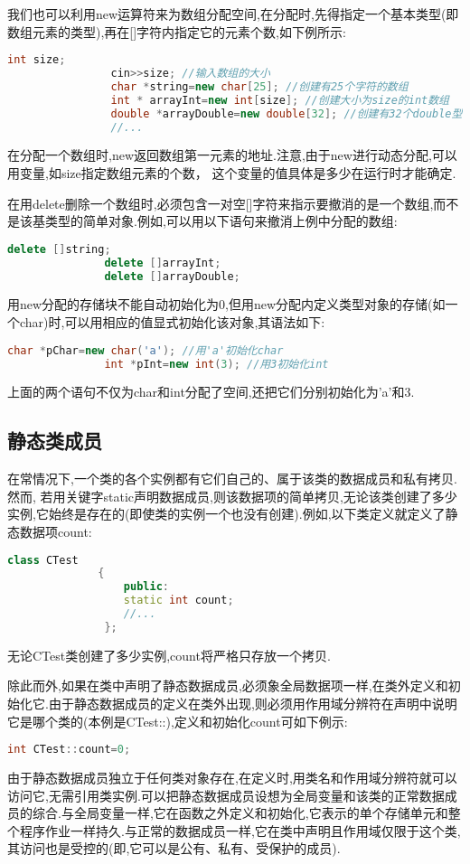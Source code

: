 \documentclass{article}
\begin{document}
我们也可以利用new运算符来为数组分配空间,在分配时,先得指定一个基本类型(即数组元素的类型),再在[]字符内指定它的元素个数,如下例所示:
\begin{lstlisting}[language=c++]
                int size;
                cin>>size; //输入数组的大小
                char *string=new char[25]; //创建有25个字符的数组
                int * arrayInt=new int[size]; //创建大小为size的int数组
                double *arrayDouble=new double[32]; //创建有32个double型元素的数组
                //...
\end{lstlisting}
在分配一个数组时,new返回数组第一元素的地址.注意,由于new进行动态分配,可以用变量,如size指定数组元素的个数， 这个变量的值具体是多少在运行时才能确定.

在用delete删除一个数组时,必须包含一对空[]字符来指示要撤消的是一个数组,而不是该基类型的简单对象.例如,可以用以下语句来撤消上例中分配的数组:
\begin{lstlisting}[language=c++]
               delete []string;
               delete []arrayInt;
               delete []arrayDouble;
\end{lstlisting}
用new分配的存储块不能自动初始化为0,但用new分配内定义类型对象的存储(如一个char)时,可以用相应的值显式初始化该对象,其语法如下:
\begin{lstlisting}[language=c++]
               char *pChar=new char('a'); //用'a'初始化char
               int *pInt=new int(3); //用3初始化int
\end{lstlisting}
上面的两个语句不仅为char和int分配了空间,还把它们分别初始化为'a'和3.
\subsection{静态类成员}
\label{sec-2-3}
在常情况下,一个类的各个实例都有它们自己的、属于该类的数据成员和私有拷贝.然而, 若用关键字static声明数据成员,则该数据项的简单拷贝,无论该类创建了多少实例,它始终是存在的(即使类的实例一个也没有创建).例如,以下类定义就定义了静态数据项count:
\begin{lstlisting}[language=c++]
              class CTest
              {
                  public:
                  static int count;
                  //...
               };
\end{lstlisting}
无论CTest类创建了多少实例,count将严格只存放一个拷贝.

除此而外,如果在类中声明了静态数据成员,必须象全局数据项一样,在类外定义和初始化它.由于静态数据成员的定义在类外出现,则必须用作用域分辨符在声明中说明它是哪个类的(本例是CTest::),定义和初始化count可如下例示:
\begin{lstlisting}[language=c++]
             int CTest::count=0;
   \end{lstlisting}
由于静态数据成员独立于任何类对象存在,在定义时,用类名和作用域分辨符就可以访问它,无需引用类实例.可以把静态数据成员设想为全局变量和该类的正常数据成员的综合.与全局变量一样,它在函数之外定义和初始化,它表示的单个存储单元和整个程序作业一样持久.与正常的数据成员一样,它在类中声明且作用域仅限于这个类,其访问也是受控的(即,它可以是公有、私有、受保护的成员).
\end{document}
